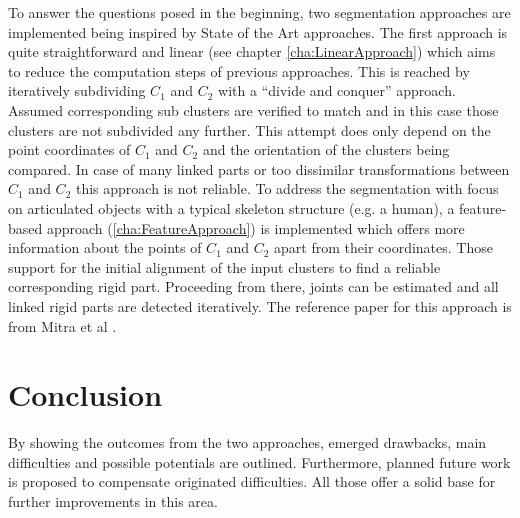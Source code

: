To answer the questions posed in the beginning, two segmentation approaches are implemented being inspired by State of the Art approaches. The first approach is quite straightforward and linear (see chapter \ref{cha:LinearApproach}) which aims to reduce the computation steps of previous approaches. This is reached by iteratively subdividing $C_1$ and $C_2$ with a ``divide and conquer'' approach. Assumed corresponding sub clusters are verified to match and in this case those clusters are not subdivided any further. This attempt does only depend on the point coordinates of $C_1$ and $C_2$ and the orientation of the clusters being compared. In case of many linked parts or too dissimilar transformations between $C_1$ and $C_2$ this approach is not reliable. To address the segmentation with focus on articulated objects with a typical skeleton structure (e.g. a human), a feature-based approach (\ref{cha:FeatureApproach}) is implemented which offers more information about the points of $C_1$ and $C_2$ apart from their coordinates. Those support for the initial alignment of the input clusters to find a reliable corresponding rigid part. Proceeding from there, joints can be estimated and all linked rigid parts are detected iteratively. The reference paper for this approach is from Mitra et al \cite{Mitra07}.

\section{Conclusion}
By showing the outcomes from the two approaches, emerged drawbacks, main difficulties and possible potentials are outlined. Furthermore, planned future work is proposed to compensate originated difficulties. All those offer a solid base for further improvements in this area. 




